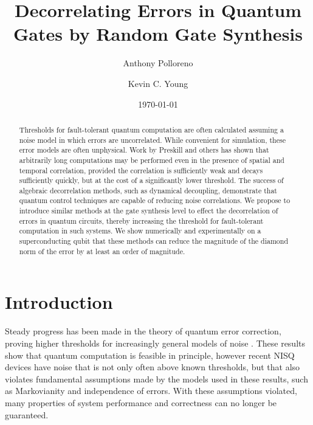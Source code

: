 \documentclass[aps,nofootinbib,pra,notitlepage,twocolumn]{revtex4-1}
\begin{document}
\title{Decorrelating Errors in Quantum Gates by Random Gate Synthesis}

\author{Anthony Polloreno}

\author{Kevin C. Young}

\date{\today}

\begin{abstract}
Thresholds for fault-tolerant quantum computation are often calculated assuming a noise model in which errors are uncorrelated. While convenient for simulation, these error models are often unphysical. Work by Preskill and others has shown that arbitrarily long computations may be performed even in the presence of spatial and temporal correlation, provided the correlation is sufficiently weak and decays sufficiently quickly, but at the cost of a significantly lower threshold. The success of algebraic decorrelation methods, such as dynamical decoupling, demonstrate that quantum control techniques are capable of reducing noise correlations. We propose to introduce similar methods at the gate synthesis level to effect the decorrelation of errors in quantum circuits, thereby increasing the threshold for fault-tolerant computation in such systems. We show numerically and experimentally on a superconducting qubit that these methods can reduce the magnitude of the diamond norm of the error by at least an order of magnitude.
\end{abstract}

\pacs{}

\maketitle

\section{Introduction}

Steady progress has been made in the theory of quantum error correction, proving higher thresholds for increasingly general models of noise \cite{Aharonov2006, 1609.00510, https://doi.org/10.7907/z96m34sc, Kubica2018, Wang2003, Campbell2017}. These results show that quantum computation is feasible in principle, however recent NISQ \cite{Preskill2018} devices have noise that is not only often above known thresholds, but that also violates fundamental assumptions made by the models used in these results\cite{Kelly2018, BlumeKohout2017, Klimov2018}, such as Markovianity \cite{Kitaev1997} and independence of errors\cite{Knill1998}. With these assumptions violated, many properties of system performance and correctness can no longer be guaranteed.
\end{document}
